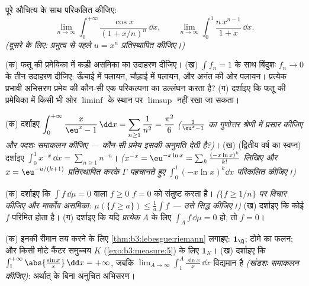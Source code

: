 \begin{exercise}[$\star$]\label{exo:b3:lebesgue:2}
पूरे औचित्य के साथ परिकलित कीजिए:
\[
\lim_{n\to\infty}\int_0^{+\infty}
\frac{\cos x}{(1 + x/n)^{n}}\,\dd x,
\qquad
\lim_{n\to\infty}\int_0^1 \frac{n\,x^{n-1}}{1 + x}\,\dd x .
\]
\emph{(दूसरे के लिए: प्रभुत्व से पहले $u = x^n$ प्रतिस्थापित कीजिए।)}
\end{exercise}

\begin{exercise}[$\star\star$]\label{exo:b3:lebesgue:3}
(क) फतू की प्रमेयिका में कड़ी असमिका का उदाहरण दीजिए।
(ख) $\int f_n = 1$ के साथ बिंदुशः $f_n \to 0$ के तीन उदाहरण दीजिए: ऊँचाई में
पलायन, चौड़ाई में पलायन, और अनंत की ओर पलायन। प्रत्येक प्रभावी
अभिसरण प्रमेय की कौन-सी एक परिकल्पना का उल्लंघन करता है?
(ग) दर्शाइए कि फतू की प्रमेयिका में किसी भी ओर $\liminf$ के स्थान पर
$\limsup$ नहीं रखा जा सकता।
\end{exercise}

\begin{exercise}[$\star\star$]\label{exo:b3:lebesgue:4}
(क) दर्शाइए $\displaystyle\int_0^{+\infty}\frac{x}{\eu^x -
1}\,\dd x = \sum_{n\geq1}\frac1{n^2} = \frac{\pi^2}6$ \emph{($\frac1{\eu^x - 1}$ का गुणोत्तर श्रेणी में प्रसार
कीजिए और पदशः समाकलन कीजिए --- कौन-सी प्रमेय इसकी अनुमति देती
है?)}।
(ख) (द्वितीय वर्ष का स्वप्न) दर्शाइए $\displaystyle\int_0^1 x^{-x}\,\dd x = \sum_{n\geq1}n^{-n}$। \emph{($x^{-x} = \eu^{-x\ln x} = \sum_k\frac{(-x\ln
x)^k}{k!}$ लिखिए
और $x = \eu^{-u/(k+1)}$ प्रतिस्थापित करके $\Gamma$ पहचानते हुए $\int_0^1(-x\ln x)^k\dd x$ परिकलित
कीजिए।)}
\end{exercise}

\begin{exercise}[$\star\star$]\label{exo:b3:lebesgue:5}
(क) दर्शाइए कि $\int f\,\dd\mu = 0$ वाला  $f \geq 0$  $f = 0$ को
संतुष्ट करता है। \emph{($\{f \geq 1/n\}$ पर विचार कीजिए और मार्कोव असमिका:
$\mu(\{f \geq a\}) \leq \frac1a\int f$ --- उसे सिद्ध कीजिए।)}
(ख) दर्शाइए कि कोई  $f$  परिमित होता है।
(ग) दर्शाइए कि यदि \emph{प्रत्येक}  $A$ के लिए $\int_A f\,\dd\mu = 0$ हो,
तो  $f = 0$।
\end{exercise}

\begin{exercise}[$\star\star$]\label{exo:b3:lebesgue:6}
(क) इनकी रीमान  तय करने के लिए \cref{thm:b3:lebesgue:riemann} लगाइए: $\mathbf 1_\Q$;
टोमे का फलन; और किसी मोटे कैंटर समुच्चय $K$ (\cref{exo:b3:measure:5}) के लिए
$\mathbf
1_K$।
(ख) दर्शाइए कि $\int_1^{+\infty}\abs{\frac{\sin x}x}\,\dd x =
+\infty$, जबकि $\lim_{A\to\infty}\int_1^A\frac{\sin
x}x\,\dd x$ विद्यमान है \emph{(खंडशः
समाकलन कीजिए)}: अर्थात्  के बिना अनुचित अभिसरण।
\end{exercise}

